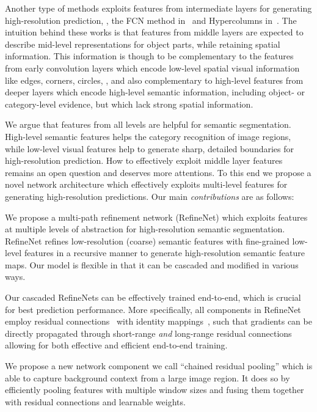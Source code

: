 \documentclass[10pt,twocolumn,letterpaper]{article}
\begin{document}
Another type of methods exploits features from intermediate layers for generating high-resolution prediction, \eg, the FCN method in~\cite{LongSD14} and Hypercolumns in~\cite{hariharan2014hypercolumns}.
The intuition behind these works is that features from middle layers are expected to describe mid-level representations for object parts, while retaining spatial information. This information is though to be complementary to the features from early convolution layers which encode low-level spatial visual information like edges, corners, circles, \etc, and also complementary to high-level features from deeper layers which encode high-level semantic information, including object- or category-level evidence, but which lack strong spatial information.


We argue that features from all levels are helpful for semantic segmentation. High-level semantic features helps the category recognition of image regions, while low-level visual features help to generate sharp, detailed boundaries for high-resolution prediction.  
How to effectively exploit middle layer features remains an open question and deserves more attentions.
To this end we propose a novel network architecture which effectively exploits multi-level features for generating high-resolution predictions.
Our main \emph{contributions} are as follows:

  \item We propose a multi-path refinement network (RefineNet) 
  which exploits features at multiple levels of abstraction for high-resolution semantic segmentation. 
  RefineNet refines low-resolution (coarse) semantic features with fine-grained low-level features in a recursive manner to generate high-resolution semantic feature maps. Our model is flexible in that it can be cascaded and modified in various ways. 

  \item 
  Our cascaded RefineNets can be effectively trained end-to-end, which is crucial for best prediction performance.
  More specifically, all components in RefineNet employ residual connections~\cite{He:2016:ResNet} with identity mappings~\cite{he2016identity},
  such that gradients can be directly propagated through short-range {\em and} long-range residual connections allowing for both effective and efficient end-to-end training.


  \item We propose a new network component we call ``chained residual pooling'' which is able to capture background context from a large image region.
	It does so by efficiently pooling features with multiple window sizes and fusing them together with residual connections and learnable weights.
   
\end{document}
